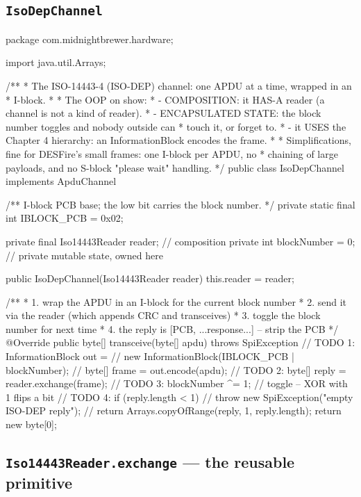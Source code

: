 \subsection{\texttt{IsoDepChannel}}

\begin{jcode}
package com.midnightbrewer.hardware;

import java.util.Arrays;

/**
 * The ISO-14443-4 (ISO-DEP) channel: one APDU at a time, wrapped in an
 * I-block.
 *
 * The OOP on show:
 *   - COMPOSITION: it HAS-A reader (a channel is not a kind of reader).
 *   - ENCAPSULATED STATE: the block number toggles and nobody outside can
 *     touch it, or forget to.
 *   - it USES the Chapter 4 hierarchy: an InformationBlock encodes the frame.
 *
 * Simplifications, fine for DESFire's small frames: one I-block per APDU, no
 * chaining of large payloads, and no S-block "please wait" handling.
 */
public class IsoDepChannel implements ApduChannel {

    /** I-block PCB base; the low bit carries the block number. */
    private static final int IBLOCK_PCB = 0x02;

    private final Iso14443Reader reader;  // composition
    private int blockNumber = 0;          // private mutable state, owned here

    public IsoDepChannel(Iso14443Reader reader) {
        this.reader = reader;
    }

    /**
     *   1. wrap the APDU in an I-block for the current block number
     *   2. send it via the reader (which appends CRC and transceives)
     *   3. toggle the block number for next time
     *   4. the reply is [PCB, ...response...] -- strip the PCB
     */
    @Override
    public byte[] transceive(byte[] apdu) throws SpiException {
        // TODO 1: InformationBlock out =
        //             new InformationBlock(IBLOCK_PCB | blockNumber);
        //         byte[] frame = out.encode(apdu);
        // TODO 2: byte[] reply = reader.exchange(frame);
        // TODO 3: blockNumber ^= 1;    // toggle -- XOR with 1 flips a bit
        // TODO 4: if (reply.length < 1)
        //             throw new SpiException("empty ISO-DEP reply");
        //         return Arrays.copyOfRange(reply, 1, reply.length);
        return new byte[0];
    }
}
\end{jcode}

\subsection{\texttt{Iso14443Reader.exchange} --- the reusable primitive}

